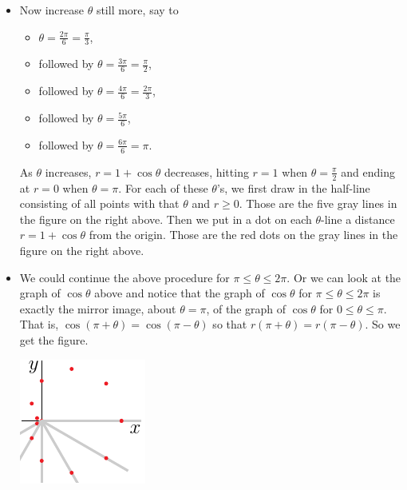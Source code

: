 \begin{eg}
\begin{itemize}
\item
Now increase $\theta$ still more, say to 
    \begin{itemize}\itemsep1pt \parskip0pt 
        \item
          $\theta=\frac{2\pi}{6}=\frac{\pi}{3}$,
        \item
          followed by $\theta=\frac{3\pi}{6}=\frac{\pi}{2}$, 
        \item
          followed by $\theta=\frac{4\pi}{6}=\frac{2\pi}{3}$,
        \item
          followed by $\theta=\frac{5\pi}{6}$,
        \item
          followed by $\theta=\frac{6\pi}{6}=\pi$.
   \end{itemize}          
As $\theta$ increases, $r=1+\cos\theta$ decreases, hitting $r=1$ when 
$\theta=\frac{\pi}{2}$ and ending at $r=0$ when $\theta=\pi$.
For each of these $\theta$'s,  we first draw in the half-line consisting 
of all points with that $\theta$ and $r\ge 0$. 
Those are the five gray lines in the figure on the right above.
Then we put in a dot on each $\theta$-line a distance $r=1+\cos\theta$ 
from the origin. Those are the red dots on the gray lines in the 
figure on the right above.

\item 
We could continue the above procedure for $\pi\le\theta\le 2\pi$.
Or we can look at the graph of $\cos\theta$ above and notice that
the graph of $\cos\theta$ for $\pi\le\theta\le 2\pi$
is exactly the mirror image, about $\theta=\pi$, of the graph of $\cos\theta$
for $0\le\theta\le \pi$. 
That is, $\cos(\pi+\theta) =\cos(\pi-\theta)$
so that $r(\pi+\theta) = r(\pi-\theta)$. So we get the figure.
\begin{efig}
\begin{center}
    \includegraphics{cardiod4.pdf}
\end{center}
\end{efig}


\end{itemize}
\end{eg}
